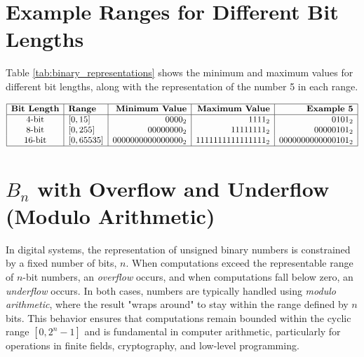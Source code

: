 \section{Example Ranges for Different Bit Lengths}

Table \ref{tab:binary_representations} shows the minimum and maximum values for different bit lengths, along with the representation of the number 5 in each range.

\begin{table}[h!]
\centering
\caption{Binary Representations for Different Bit Lengths}
\label{tab:binary_representations}
\[
\begin{array}{|c|l|r|r|r|}
\hline
\textbf{Bit Length} & \textbf{Range} & \textbf{Minimum Value} & \textbf{Maximum Value} & \textbf{Example 5} \\
\hline
4\text{-bit}  & [0, 15]            & 0000_2 & 1111_2  & 0101_2 \\
8\text{-bit}  & [0, 255]           & 00000000_2 & 11111111_2 & 00000101_2 \\
16\text{-bit} & [0, 65535]         & 0000000000000000_2 & 1111111111111111_2 & 0000000000000101_2 \\
\hline
\end{array}
\]
\end{table}

\section{\( B_n \) with Overflow and Underflow (Modulo Arithmetic)}
In digital systems, the representation of unsigned binary numbers is constrained by a fixed number of bits, \( n \). When computations exceed the representable range of \( n \)-bit numbers, an \textit{overflow} occurs, and when computations fall below zero, an \textit{underflow} occurs. In both cases, numbers are typically handled using \textit{modulo arithmetic}, where the result "wraps around" to stay within the range defined by \( n \) bits. This behavior ensures that computations remain bounded within the cyclic range \( [0, 2^n - 1] \) and is fundamental in computer arithmetic, particularly for operations in finite fields, cryptography, and low-level programming.



